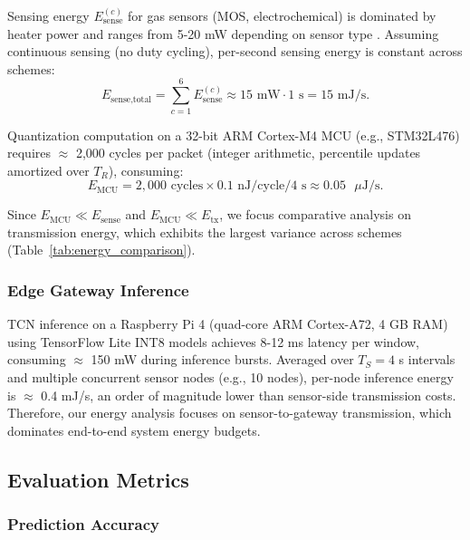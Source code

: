 Sensing energy $E_{\text{sense}}^{(c)}$ for gas sensors (MOS, electrochemical) is dominated by heater power and ranges from 5-20 mW depending on sensor type \cite{przystupa2025ensuring}. Assuming continuous sensing (no duty cycling), per-second sensing energy is constant across schemes:
\begin{equation}
E_{\text{sense,total}} = \sum_{c=1}^{6} E_{\text{sense}}^{(c)} \approx 15 \text{ mW} \cdot 1 \text{ s} = 15 \text{ mJ/s}.
\label{eq:sensing_energy}
\end{equation}

Quantization computation on a 32-bit ARM Cortex-M4 MCU (e.g., STM32L476) requires $\approx$ 2,000 cycles per packet (integer arithmetic, percentile updates amortized over $T_R$), consuming:
\begin{equation}
E_{\text{MCU}} = 2{,}000 \text{ cycles} \times 0.1 \text{ nJ/cycle} / 4 \text{ s} \approx 0.05 \text{ } \mu\text{J/s}.
\label{eq:mcu_energy}
\end{equation}

Since $E_{\text{MCU}} \ll E_{\text{sense}}$ and $E_{\text{MCU}} \ll E_{\text{tx}}$, we focus comparative analysis on transmission energy, which exhibits the largest variance across schemes (Table~\ref{tab:energy_comparison}).

\subsubsection{Edge Gateway Inference}

TCN inference on a Raspberry Pi 4 (quad-core ARM Cortex-A72, 4 GB RAM) using TensorFlow Lite INT8 models achieves 8-12 ms latency per window, consuming $\approx$ 150 mW during inference bursts. Averaged over $T_S = 4$ s intervals and multiple concurrent sensor nodes (e.g., 10 nodes), per-node inference energy is $\approx$ 0.4 mJ/s, an order of magnitude lower than sensor-side transmission costs. Therefore, our energy analysis focuses on sensor-to-gateway transmission, which dominates end-to-end system energy budgets.

\subsection{Evaluation Metrics}

\subsubsection{Prediction Accuracy}

